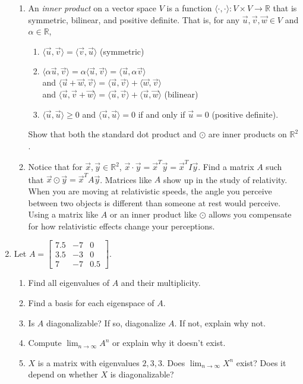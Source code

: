 \documentclass[letter]{article}
\newcommand{\R}{\mathbb{R}}
\newcommand{\mat}[1]{\begin{bmatrix}#1\end{bmatrix}}
\begin{document}
\begin{enumerate}
\begin{enumerate}
				\item  An \emph{inner product} on a vector space $V$ is a function $\langle \cdot,\cdot\rangle:V\times V\to\R$
					that is symmetric, bilinear, and positive definite.  That is, for any $\vec u,\vec v,\vec w\in V$
					and $\alpha\in\R$,
					\begin{enumerate}
						\item $\langle \vec u,\vec v\rangle =\langle \vec v,\vec u\rangle$ (symmetric)
						\item $\langle \alpha\vec u,\vec v\rangle =\alpha\langle \vec u,\vec v\rangle =\langle \vec u,\alpha\vec v\rangle$\\
							and $\langle \vec u+\vec w,\vec v\rangle =\langle \vec u,\vec v\rangle+\langle \vec w,\vec v\rangle$\\
							and $\langle \vec u,\vec v+\vec w\rangle =\langle \vec u,\vec v\rangle+\langle \vec u,\vec w\rangle$ (bilinear)
						\item $\langle \vec u,\vec u\rangle\geq 0$ and $\langle \vec u,\vec u\rangle=0$ if and only if $\vec u=0$ (positive definite).
					\end{enumerate}

					Show that both the standard dot product and $\odot$ are inner products on $\R^2$.
				\item Notice that for $\vec x,\vec y\in\R^2$, $\vec x\cdot\vec y = \vec x^T\vec y=\vec x^TI\vec y$.
					Find a matrix $A$ such that $\vec x\odot \vec y=\vec x^TA\vec y$.  Matrices like $A$ 
					show up in the study of relativity.  When you are moving at relativistic speeds, the angle
					you perceive between two objects is different than someone at rest would perceive.  Using
					a matrix like $A$ or an inner product like $\odot$ allows you compensate for how relativistic
					effects change your perceptions.
			\end{enumerate}

		\item Let $A=\mat{7.5&-7&0\\3.5&-3&0\\7&-7&0.5}$.
		\begin{enumerate}
			\item Find all eigenvalues of $A$ and their multiplicity.
			\item Find a basis for each eigenspace of $A$.
			\item Is $A$ diagonalizable?  If so, diagonalize $A$.  If not, explain why
				not.
			\item Compute $\lim_{n\to\infty} A^n$ or explain why it doesn't exist.  
			\item $X$ is a matrix with eigenvalues $2,3,3$.  Does $\lim_{n\to\infty} X^n$ exist?
				Does it depend on whether $X$ is diagonalizable?
		\end{enumerate}
		

\end{enumerate}
\end{document}
